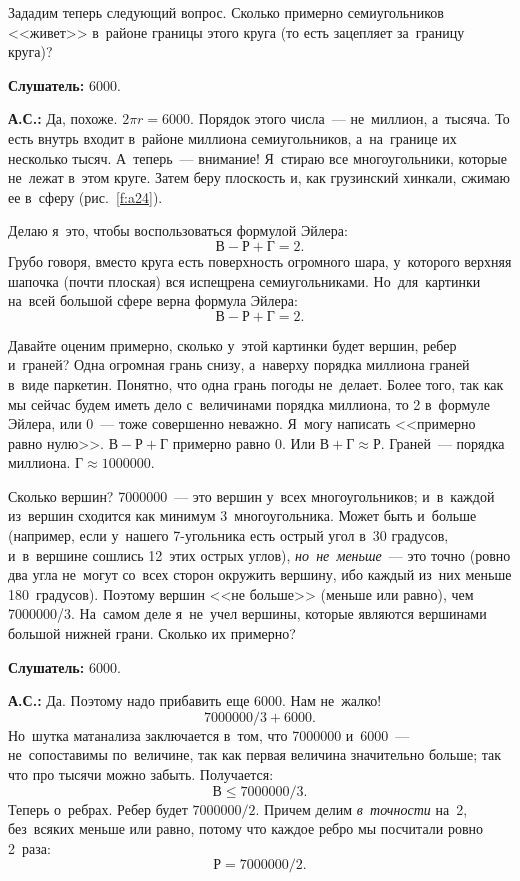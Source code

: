 Зададим теперь следующий вопрос. Сколько примерно семиугольников <<живет>> в~районе границы этого
круга (то есть зацепляет за~границу круга)?

\textbf{Слушатель:} 6000.

\textbf{А.С.:} Да, похоже. $2\pi r=6000$. Порядок этого числа~--- не~миллион, а~тысяча. То есть
внутрь входит в~районе миллиона семиугольников, а~на~границе их несколько тысяч. А~теперь~---
внимание! Я~стираю все многоугольники, которые не~лежат в~этом круге. Затем беру плоскость и, как
грузинский хинкали, сжимаю ее в~сферу (рис.~\ref{f:a24}).


Делаю я~это, чтобы воспользоваться формулой Эйлера:
$$
\text{В}-\text{Р}+\text{Г}=2.
$$
Грубо говоря, вместо круга есть поверхность огромного шара, у~которого верхняя шапочка (почти
плоская) вся испещрена семиугольниками. Но~для~картинки на~всей большой сфере верна формула Эйлера:
$$
\text{В}-\text{Р}+\text{Г}=2.
$$


Давайте оценим примерно, сколько у~этой картинки будет вершин, ребер и~граней? Одна огромная грань
снизу, а~наверху порядка миллиона граней в~виде паркетин. Понятно, что одна грань погоды не~делает.
Более того, так как мы сейчас будем иметь дело с~величинами порядка миллиона, то 2 в~формуле
Эйлера, или 0~--- тоже совершенно неважно. Я~могу написать <<примерно равно нулю>>. $\text{В}-\text{Р}+\text{Г}$ примерно равно $0$.
Или $\text{В}+\text{Г}\approx \text{Р}$.
Граней~--- порядка миллиона.
$\text{Г}\approx 1 000 000$.

Сколько вершин? 7000000~--- это вершин у~всех многоугольников; и~в~каждой из~вершин сходится как
минимум 3~многоугольника. Может быть и~больше (например, если у~нашего 7-угольника есть острый угол
в~30 градусов, и~в~вершине сошлись 12~этих острых углов), \textit{но~не~меньше}~--- это точно (ровно два
угла не~могут со~всех сторон окружить вершину, ибо каждый из~них меньше 180~градусов). Поэтому
вершин <<не больше>> (меньше или равно), чем 7000000/3. На~самом деле я~не~учел вершины,
которые являются вершинами большой нижней грани. Сколько их примерно?

\textbf{Слушатель:} 6000.

\textbf{А.С.:} Да. Поэтому надо прибавить еще 6000. Нам не~жалко!
$$
7 000 000/3 + 6000.
$$
Но~шутка матанализа заключается в~том, что 7000000 и~6000~--- не~сопоставимы по~величине, так как
первая величина значительно больше; так что про тысячи можно забыть.
 Получается:
$$
\text{В}\le 7 000 000/3.
$$
Теперь о~ребрах. Ребер будет $7 000 000/2$.
Причем делим \textit{в~точности} на~2, без~всяких меньше или равно, потому что каждое ребро мы посчитали ровно 2~раза:
$$
\text{Р}=7 000 000/2.
$$

